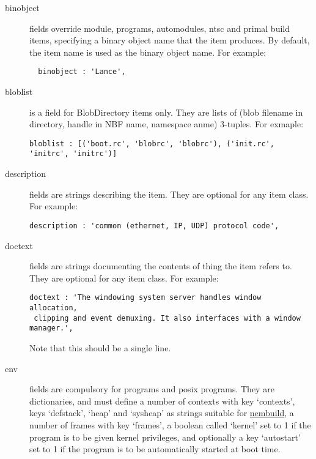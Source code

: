 \documentclass[a4paper]{article}
\begin{document}
\begin{description}

\item[binobject] fields override module, programs, automodules, ntsc
and primal build items, specifying a binary object name that the item
produces. By default, the item name is used as the binary object name. For example:

\begin{verbatim}
  binobject : 'Lance',
\end{verbatim}


\item[bloblist] is a field for BlobDirectory items only. They are
  lists of (blob 
filename in directory, handle in NBF name, namespace anme)
3-tuples. For exmaple:

\begin{verbatim}
bloblist : [('boot.rc', 'blobrc', 'blobrc'), ('init.rc', 'initrc', 'initrc')]
\end{verbatim}


\item[description] fields are strings describing the item. They are
optional for any item class. For example:

\begin{verbatim}
description : 'common (ethernet, IP, UDP) protocol code',
\end{verbatim}


\item[doctext] fields are strings documenting the contents of thing
the item refers to. They are optional for any item class. For example:

\begin{verbatim}
doctext : 'The windowing system server handles window allocation,
 clipping and event demuxing. It also interfaces with a window manager.',
\end{verbatim}

Note that this should be a single line.


\item[env] fields are compulsory for programs and posix programs. They
are dictionaries, and must define a number of contexts with key
`contexts', keys `defstack', `heap' and `sysheap' as strings suitable
for \url{nembuild}, a number of frames with key `frames', a boolean
called `kernel' set to 1 if the program is to be given kernel
privileges, and optionally a key `autostart' set to 1 if the program
is to be automatically started at boot time.


\end{description}
\end{document}
